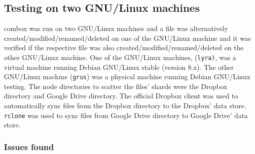 \subsection{Testing on two GNU/Linux machines}

combox was run on two GNU/Linux machines and a file was alternatively
created/modified/renamed/deleted on one of the GNU/Linux machine and
it was verified if the respective file was also
created/modified/renamed/deleted on the other GNU/Linux machine. One
of the GNU/Linux machines, (\verb+lyra)+, was a virtual machine
running Debian GNU/Linux stable (version 8.x). The other GNU/Linux
machine (\verb+grus+) was a physical machine running Debian GNU/Linux
testing. The node directories to scatter the files' shards were the
Dropbox directory and Google Drive directory. The official Dropbox
client was used to automatically sync files from the Dropbox directory
to the Dropbox' data store. \verb+rclone+ \cite{program:rclone} was
used to sync files from Google Drive directory to Google Drive' data
store.

\subsubsection{Issues found}\label{ch-4-2gnus-issues}

